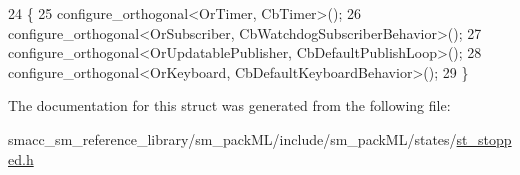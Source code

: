 \begin{DoxyCode}
24     \{
25         configure\_orthogonal<OrTimer, CbTimer>();   
26         configure\_orthogonal<OrSubscriber, CbWatchdogSubscriberBehavior>();
27         configure\_orthogonal<OrUpdatablePublisher, CbDefaultPublishLoop>();
28         configure\_orthogonal<OrKeyboard, CbDefaultKeyboardBehavior>();
29     \}
\end{DoxyCode}


The documentation for this struct was generated from the following file\+:\begin{DoxyCompactItemize}
\item 
smacc\+\_\+sm\+\_\+reference\+\_\+library/sm\+\_\+pack\+M\+L/include/sm\+\_\+pack\+M\+L/states/\hyperlink{sm__packML_2include_2sm__packML_2states_2st__stopped_8h}{st\+\_\+stopped.\+h}\end{DoxyCompactItemize}
